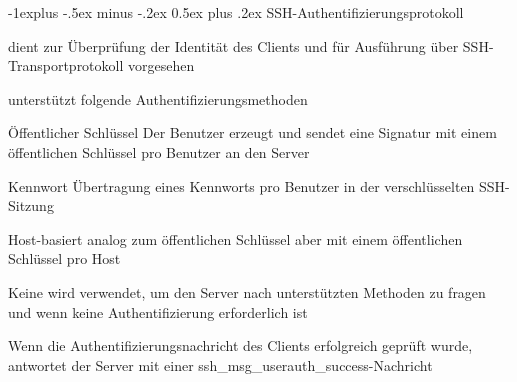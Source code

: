 \documentclass[a4paper]{article}
\makeatletter
\renewcommand{\subsection}{\@startsection{subsection}{2}{0mm}%
 {-1explus -.5ex minus -.2ex}%
 {0.5ex plus .2ex}%
 {\normalfont\normalsize\bfseries}}
\makeatother
\begin{document}
\begin{multicols}{3}
      \subsection{SSH-Authentifizierungsprotokoll}
      \begin{itemize*}
            \item dient zur Überprüfung der Identität des Clients und für Ausführung über SSH-Transportprotokoll vorgesehen
            \item unterstützt folgende Authentifizierungsmethoden
            \begin{description*}
                  \item[Öffentlicher Schlüssel] Der Benutzer erzeugt und sendet eine Signatur mit einem öffentlichen Schlüssel pro Benutzer an den Server %
                  \item[Kennwort] Übertragung eines Kennworts pro Benutzer in der verschlüsselten SSH-Sitzung %
                  \item[Host-basiert] analog zum öffentlichen Schlüssel aber mit einem öffentlichen Schlüssel pro Host
                  \item[Keine] wird verwendet, um den Server nach unterstützten Methoden zu fragen und wenn keine Authentifizierung erforderlich ist %
            \end{description*}
            \item Wenn die Authentifizierungsnachricht des Clients erfolgreich geprüft wurde, antwortet der Server mit einer ssh\_msg\_userauth\_success-Nachricht
      \end{itemize*}


\end{multicols}
\end{document}
